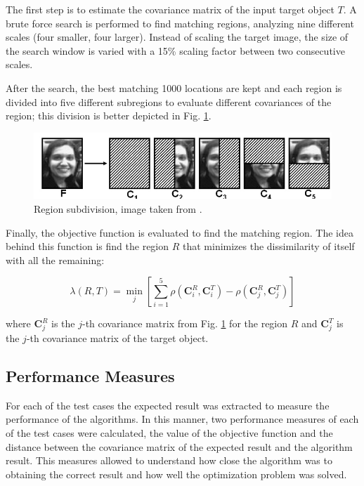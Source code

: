 \documentclass[11pt]{article}
\theoremstyle{definition}
\theoremstyle{remark}
\theoremstyle{remark}
\theoremstyle{remark}
\begin{document}
The first step is to estimate the covariance matrix of the input target object $T$. A brute force search is performed to find matching regions, analyzing nine different scales (four smaller, four larger). Instead of scaling the target image, the size of the search window is varied with a 15\% scaling factor between two consecutive scales. 

After the search, the best matching 1000 locations are kept and each region is divided into five different subregions to evaluate different covariances of the region; this division is better depicted in Fig. \ref{fig:regions}.

\begin{figure}[H]
    \centering
    \includegraphics[scale=.6]{figs/regions.png}
    \caption{Region subdivision, image taken from \parencite{tuzel2006}.}
    \label{fig:regions}
\end{figure}

Finally, the objective function is evaluated to find the matching region. The idea behind this function is find the region $R$ that minimizes the dissimilarity of itself with all the remaining:

\begin{equation*}
    \lambda(R, T)=\min _{j}\left[\sum_{i=1}^{5} \rho\left(\mathbf{C}_{i}^{R}, \mathbf{C}_{i}^{T}\right)-\rho\left(\mathbf{C}_{j}^{R}, \mathbf{C}_{j}^{T}\right)\right]
\end{equation*}

where $\mathbf{C}_j^R$ is the $j$-th covariance matrix from Fig. \ref{fig:regions} for the region $R$ and $\mathbf{C}_j^T$ is the $j$-th covariance matrix of the target object.

\subsection{Performance Measures}
For each of the test cases the expected result was extracted to measure the performance of the algorithms. In this manner, two performance measures of each of the test cases were calculated, the value of the objective function and the distance between the covariance matrix of the expected result and the algorithm result. This measures allowed to understand how close the algorithm was to obtaining the correct result and how well the optimization problem was solved.
\end{document}
